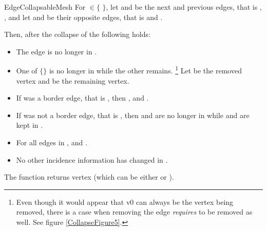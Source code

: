\begin{ccRefConcept}{EdgeCollapsableMesh}
For  $\in \{$  $\}$, let  and  be the next and previous 
edges, that is , , and let 
 and  be their opposite edges, that is 
 and .

Then, after the collapse of  the following holds:

\begin{itemize}
\item The edge  is no longer in .
\item One of $\{$$\}$ is no longer in  while the other remains.
\footnote{Even though it would appear that v0 can always be the vertex being removed, there is a case when removing the edge  {\em requires}  to be removed as well. See figure \ref{CollapseFigure5}.}
Let  be the removed vertex and  be the remaining vertex.
\item If  was a border edge, that is , then , and .
\item If  was not a border edge, that is , then  and  are no longer in  while  and  are kept in .
\item For all edges  in ,  and .
\item No other incidence information has changed in .
\end{itemize}

The function returns vertex  (which can be either  or ). 


\end{ccRefConcept}

